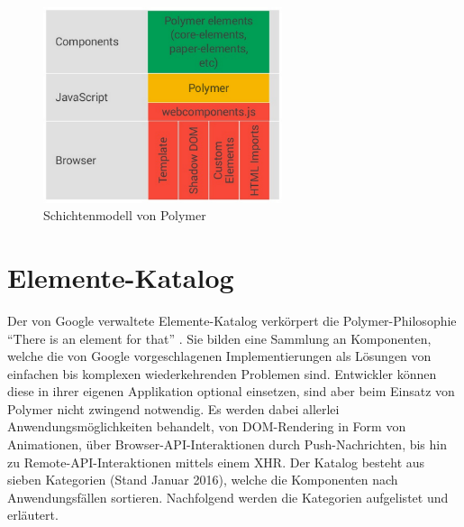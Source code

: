 \begin{figure}[h]
 \centering
 \includegraphics[width=7cm,keepaspectratio]{kapitel3/bilder/1-architektur}
 \caption{Schichtenmodell von Polymer}
 \label{fig:schimopo}
\end{figure}


\section{Elemente-Katalog}\label{elemente-katalog}

Der von Google verwaltete Elemente-Katalog verkörpert die Polymer-Philosophie ``There is an element for that'' \cite{citeulike:13930590}. Sie bilden eine Sammlung an Komponenten, welche die von Google vorgeschlagenen Implementierungen als Lösungen von einfachen bis komplexen wiederkehrenden Problemen sind. Entwickler können diese in ihrer eigenen Applikation optional einsetzen, sind aber beim Einsatz von Polymer nicht zwingend notwendig. Es werden dabei allerlei Anwendungsmöglichkeiten behandelt, von \ac{DOM}-Rendering in Form von Animationen, über Browser-\ac{API}-Interaktionen durch Push-Nachrichten, bis hin zu Remote-\ac{API}-Interaktionen mittels einem \ac{XHR}. Der Katalog besteht aus sieben Kategorien (Stand Januar 2016), welche die Komponenten nach Anwendungsfällen sortieren. Nachfolgend werden die Kategorien aufgelistet und erläutert.



